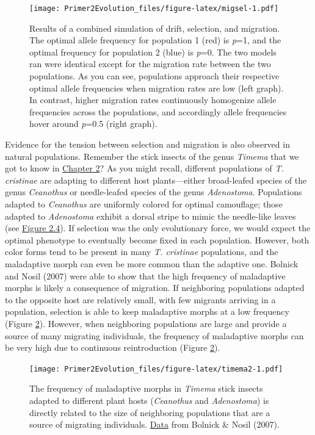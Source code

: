 \documentclass[
]{book}
\begin{document}
\begin{figure}
\centering
\texttt{[image: Primer2Evolution\_files/figure-latex/migsel-1.pdf]}
\caption{\label{fig:migsel}Results of a combined simulation of drift, selection, and migration. The optimal allele frequency for population 1 (red) is \emph{p}=1, and the optimal frequency for population 2 (blue) is \emph{p}=0. The two models ran were identical except for the migration rate between the two populations. As you can see, populations approach their respective optimal allele frequencies when migration rates are low (left graph). In contrast, higher migration rates continuously homogenize allele frequencies across the populations, and accordingly allele frequencies hover around \emph{p}=0.5 (right graph).}
\end{figure}

Evidence for the tension between selection and migration is also observed in natural populations. Remember the stick insects of the genus \emph{Timema} that we got to know in \href{evidence-for-evolution.html\#catching-speciation-in-action}{Chapter 2}? As you might recall, different populations of \emph{T. cristinae} are adapting to different host plants---either broad-leafed species of the genus \emph{Ceanothus} or needle-leafed species of the genus \emph{Adenostoma}. Populations adapted to \emph{Ceanothus} are uniformly colored for optimal camouflage; those adapted to \emph{Adenostoma} exhibit a dorsal stripe to mimic the needle-like leaves (see \href{evidence-for-evolution.html\#catching-speciation-in-action}{Figure 2.4}). If selection was the only evolutionary force, we would expect the optimal phenotype to eventually become fixed in each population. However, both color forms tend to be present in many \emph{T. cristinae} populations, and the maladaptive morph can even be more common than the adaptive one. Bolnick and Nosil (2007) were able to show that the high frequency of maladaptive morphs is likely a consequence of migration. If neighboring populations adapted to the opposite host are relatively small, with few migrants arriving in a population, selection is able to keep maladaptive morphs at a low frequency (Figure \ref{fig:timema2}). However, when neighboring populations are large and provide a source of many migrating individuals, the frequency of maladaptive morphs can be very high due to continuous reintroduction (Figure \ref{fig:timema2}).

\begin{figure}
\centering
\texttt{[image: Primer2Evolution\_files/figure-latex/timema2-1.pdf]}
\caption{\label{fig:timema2}The frequency of maladaptive morphs in \emph{Timema} stick insects adapted to different plant hosts (\emph{Ceanothus} and \emph{Adenostoma}) is directly related to the size of neighboring populations that are a source of migrating individuals. \href{data/6_timema_migration.csv}{Data} from Bolnick \& Nosil (2007).}
\end{figure}
\end{document}
